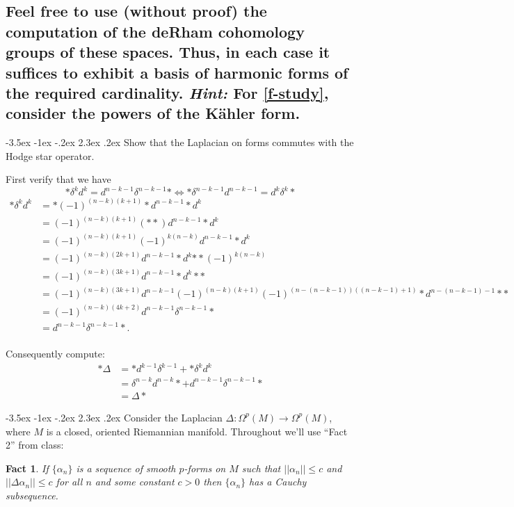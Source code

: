 \documentclass[10pt]{article}
\makeatletter
\renewcommand\section{\@startsection{section}{1}{\z@}%
                                  {-3.5ex \@plus -1ex \@minus -.2ex}%
                                  {2.3ex \@plus.2ex}%
                                  {\normalfont\large\bfseries}}
\newcommand{\adjd}[1]{(-1)^{(n-#1)(#1+1)} * d^{n-#1-1} * }
\DeclareMathOperator{\2}{II}
\newtheorem{fact}{Fact}
\newcommand{\hint}[1]{{\emph{Hint:} #1}} %
\makeatother
\begin{document}
\subsection*{Feel free to use (without proof) the computation of the deRham cohomology groups of these spaces. Thus, in each case it suffices to exhibit a basis of harmonic forms of the required cardinality.  \hint{For \ref{f-study}, consider the powers of the K\"ahler form.}}

\section{Show that the Laplacian on forms commutes with the Hodge star operator.}

First verify that we have  
\[* \delta^k d^k = d^{n-k-1} \delta^{n-k-1} * \iff * \delta^{n-k-1} d^{n-k-1} = d^{k} \delta^{k} * \]
\begin{align*}
    * \delta^k d^k & = * \adjd{k} d^k \\
    &=  (-1)^{(n-k)(k+1)} (* *) d^{n-k-1} * d^k\\
    &=  (-1)^{(n-k)(k+1)} (-1)^{k(n-k)} d^{n-k-1} * d^k\\
    &=  (-1)^{(n-k)(2k+1)}   d^{n-k-1} * d^k {** (-1)^{k(n-k)}}\\
    &=  (-1)^{(n-k)(3k+1)}   d^{n-k-1} * d^k * *  \\
    &=  (-1)^{(n-k)(3k+1)}   d^{n-k-1} (-1)^{(n-k)(k+1)}\adjd{(n-k-1)} *  \\
    &=  (-1)^{(n-k)(4k+2)}   d^{n-k-1} \delta^{n-k-1} *  \\
    &=  d^{n-k-1} \delta^{n-k-1} *. \\
\end{align*}

Consequently compute:
\begin{align*}
    * \Delta &= *d^{k-1} \delta^{k-1} + * \delta^k d^k\\
    &= \delta^{n-k}d^{n-k}* + d^{n-k-1}\delta^{n-k-1} * \\
    &= \Delta *
\end{align*}

\section{Consider the Laplacian $\Delta: \Omega^p(M) \to \Omega^p(M)$, where $M$ is a closed, oriented Riemannian manifold.}
Throughout we'll use  ``Fact 2'' from class:
\begin{fact} \label{fact2}
If $\{ \alpha_n \}$ is a sequence of smooth $p$-forms on $M$ such that $||\alpha_n || \leq c$ and $||\Delta \alpha_n || \leq c$ for all $n$ and some constant $c > 0 $ then $\{ \alpha_n \}$ has a Cauchy subsequence.
\end{fact}
\end{document}
